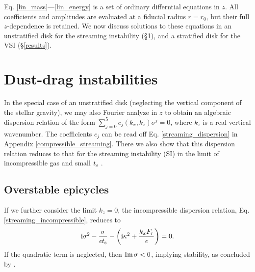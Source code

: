 
Eq. \ref{lin_mass}---\ref{lin_energy} is a set of ordinary
differntial equations in $z$. All coefficients and amplitudes are
evaluated at a fiducial radius $r=r_0$, but their full $z$-dependence
is retained. We now discuss solutions to these equations in an unstratified disk 
 for the streaming instability (\S\ref{si}), and a stratified disk for the VSI (\S\ref{results}).  
 

\section{Dust-drag instabilities}\label{si}
In the special case of an unstratified disk (neglecting the vertical
component of the stellar gravity), we may also Fourier analyze in $z$
to obtain an algebraic dispersion relation of the form  
$\sum_{j=0}^{5}c_j(k_x,k_z)\sigma^j = 0$, where $k_z$ is a real
vertical wavenumber. The coefficients $c_j$ can be read 
off Eq. \ref{streaming_dispersion} in  Appendix \ref{compressible_streaming}. 
There we also show that this dispersion relation reduces to that for
the streaming instability (SI) in the limit of incompressible gas and small
$t_\mathrm{s}$ \citep{youdin05a,jacquet11}.   
 
\subsection{Overstable epicycles}
If we further consider the limit $k_z=0$, the incompressible dispersion
relation, Eq. \ref{streaming_incompressible}, reduces to 
\begin{align}      %
\ii \sigma^2 - \frac{\sigma}{\epsilon \tstop}  - \left(\ii \kappa^2 +
  \frac{k_xF_r}{\epsilon}\right) = 0. \label{kz_zero_si}
\end{align} 
If the quadratic term is neglected, then $\operatorname{Im}{\sigma}<0$, implying
stability, as concluded by \cite{youdin05a}. 

